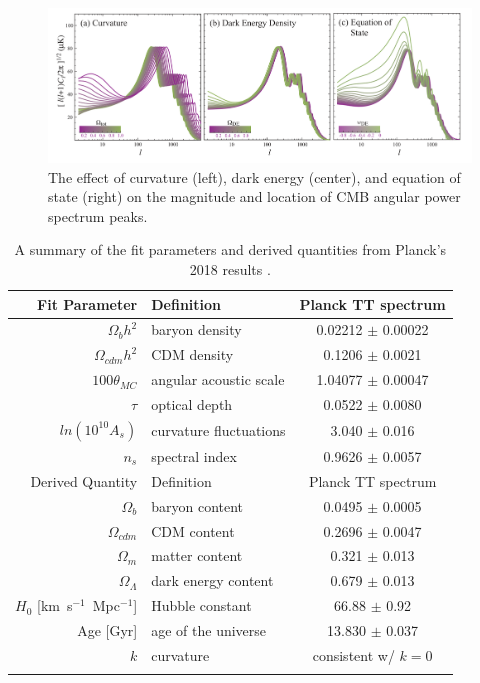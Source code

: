 \begin{figure}[htb]
\begin{center}
\includegraphics[width=\textwidth]{figures/theory/curve_etc.png}
\caption{The effect of curvature (left), dark energy (center), and equation of state (right) on the magnitude and location of \acs{CMB} angular power spectrum peaks.  \cite{Hu2008} }
\label{fig:curve_etc}
\end{center}
\end{figure}


\begin{table}[htbp]
\caption{A summary of the fit parameters and derived quantities from Planck's 2018 results \cite{Planck2018}.}
\begin{center}
\begin{tabular}{ r l c }
\hline
Fit Parameter & Definition &  Planck TT spectrum \\
\hline
$\Omega_{b}h^{2}$ & baryon density & 0.02212 $\pm$ 0.00022 \\
$\Omega_{cdm}h^{2}$ & CDM density & 0.1206 $\pm$ 0.0021 \\
$100\theta_{MC}$ & angular acoustic scale & 1.04077 $\pm$ 0.00047 \\
$\tau$ & optical depth & 0.0522 $\pm$ 0.0080 \\
$ln(10^{10}A_{s})$ & curvature fluctuations & 3.040 $\pm$ 0.016 \\
$n_{s}$ & spectral index & 0.9626 $\pm$ 0.0057 \\
\hline
Derived Quantity & Definition &  Planck TT spectrum \\
\hline
$\Omega_{b}$ & baryon content & 0.0495 $\pm$ 0.0005 \\
$\Omega_{cdm}$ & CDM content & 0.2696 $\pm$ 0.0047 \\
$\Omega_{m}$  & matter content & 0.321 $\pm$ 0.013 \\
$\Omega_{\Lambda}$  & dark energy content & 0.679 $\pm$ 0.013 \\
$H_{0}$ [km~s$^{-1}$~Mpc$^{-1}$] & Hubble constant & 66.88 $\pm$ 0.92 \\
Age [Gyr]  & age of the universe & 13.830 $\pm$  0.037 \\
$k$ & curvature & consistent w/ $k=0$ \\
\label{tb:planck}
\end{tabular}
\end{center}
\label{default}
\end{table}%


